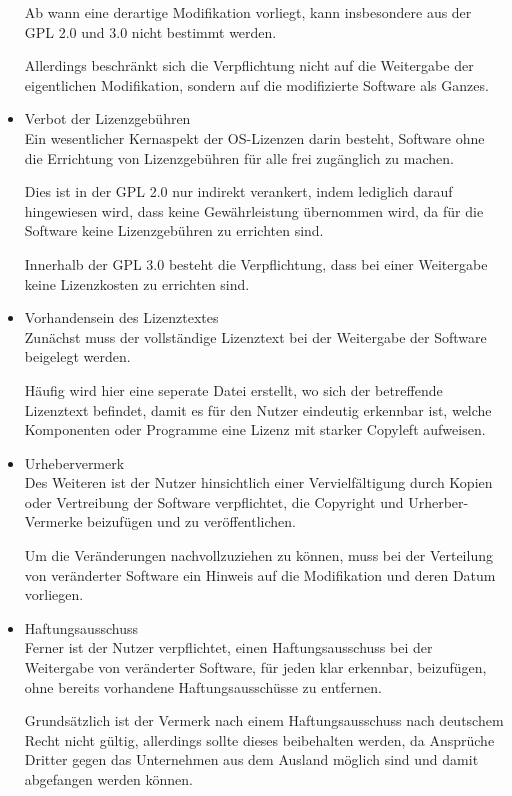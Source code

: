\begin{itemize}
    Ab wann eine derartige Modifikation vorliegt, kann insbesondere aus der GPL 2.0 und 3.0 nicht bestimmt werden.
    
    Allerdings beschränkt sich die Verpflichtung nicht auf die Weitergabe der eigentlichen Modifikation, sondern auf die modifizierte Software als Ganzes.

    \item Verbot der Lizenzgebühren\\
    Ein wesentlicher Kernaspekt der OS-Lizenzen darin besteht, Software ohne die Errichtung von Lizenzgebühren für alle frei zugänglich zu machen. 
    
    Dies ist in der GPL 2.0 nur indirekt verankert, indem lediglich darauf hingewiesen wird, dass keine Gewährleistung übernommen wird, da für die Software keine Lizenzgebühren zu errichten sind.

    Innerhalb der GPL 3.0 besteht die Verpflichtung, dass bei einer Weitergabe keine Lizenzkosten zu errichten sind. 

    \item Vorhandensein des Lizenztextes\\
    Zunächst muss der vollständige Lizenztext bei der Weitergabe der Software beigelegt werden. 

    Häufig wird hier eine seperate Datei erstellt, wo sich der betreffende Lizenztext befindet, damit es für den Nutzer eindeutig erkennbar ist, welche Komponenten oder Programme eine Lizenz mit starker Copyleft aufweisen. 

    \item Urhebervermerk\\
    Des Weiteren ist der Nutzer hinsichtlich einer Vervielfältigung durch Kopien oder Vertreibung der Software verpflichtet, die Copyright und Urherber-Vermerke beizufügen und zu veröffentlichen.
    
    Um die Veränderungen nachvollzuziehen zu können, muss bei der Verteilung von veränderter Software ein Hinweis auf die Modifikation und deren Datum vorliegen. 
    
    \item Haftungsausschuss\\
    Ferner ist der Nutzer verpflichtet, einen Haftungsausschuss bei der Weitergabe von veränderter Software, für jeden klar erkennbar, beizufügen, ohne bereits vorhandene Haftungsausschüsse zu entfernen. 
    
    Grundsätzlich ist der Vermerk nach einem Haftungsausschuss nach deutschem Recht nicht gültig, allerdings sollte dieses beibehalten werden, da Ansprüche Dritter gegen das Unternehmen aus dem Ausland möglich sind und damit abgefangen werden können.  


\end{itemize}
